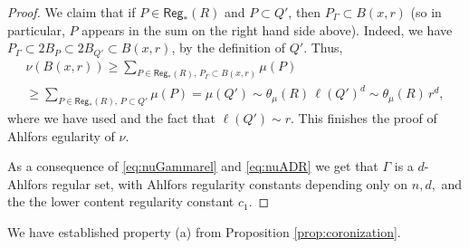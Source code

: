 \documentclass[11pt,reqno]{amsart}
\theoremstyle{definition}
\theoremstyle{remark}
\numberwithin{equation}{section}
\newcommand{\Reg}{\mathsf{Reg}_*}
\theoremstyle{theorem}
\theoremstyle{definition}
\theoremstyle{remark}
\numberwithin{equation}{section}
\begin{document}
\begin{proof}
		We claim that if $P\in\Reg(R)$ and $P\subset Q'$, then $P_\Gamma\subset B(x,r)$ (so in particular, $P$ appears in the sum on the right hand side above). Indeed, we have $P_\Gamma\subset 2B_P\subset 2B_{Q'}\subset B(x,r)$, by the definition of $Q'$. Thus,
		\begin{multline*}
		\nu(B(x,r)) \ge \sum_{P\in\Reg(R),\, P_{\Gamma}\subset B(x,r)} \mu(P)\\
		\ge \sum_{P\in\Reg(R),\, P\subset Q'} \mu(P)=\mu(Q')\sim\theta_\mu(R)\,\ell(Q')^d\sim \theta_\mu(R)\, r^d,
		\end{multline*}
		where we have used  and the fact that $\ell(Q')\sim r$. This finishes the proof of Ahlfors egularity of $\nu$.
		
		As a consequence of \eqref{eq:nuGammarel} and \eqref{eq:nuADR} we get that $\Gamma$ is a $d$-Ahlfors regular set, with Ahlfors regularity constants depending only on $n,d,$ and the the lower content regularity constant $c_1$. %
	\end{proof}
    We have established property (a) from Proposition \ref{prop:coronization}.
\end{document}
